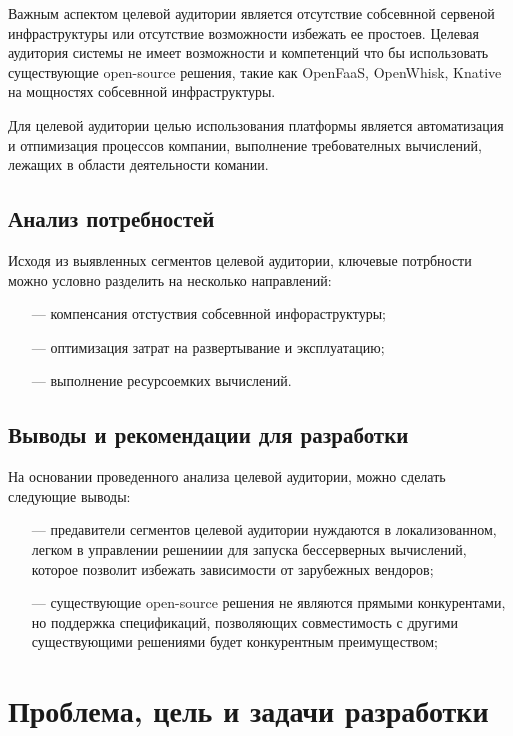 Важным аспектом целевой аудитории является отсутствие собсевнной сервеной инфраструктуры или отсутствие возможности избежать ее простоев. Целевая аудитория системы не имеет возможности и компетенций что бы использовать существующие open-source решения, такие как OpenFaaS, OpenWhisk, Knative на мощностях собсевнной инфраструктуры.

Для целевой аудитории целью использования платформы является автоматизация и отпимизация процессов компании, выполнение требователных вычислений, лежащих в области деятельности комании.

\subsection{Анализ потребностей}

Исходя из выявленных сегментов целевой аудитории, ключевые потрбности можно условно разделить на несколько направлений:
\begin{itemize}
    \item[---]компенсания отстуствия собсевнной инфораструктуры;
    \item[---]оптимизация затрат на развертывание и эксплуатацию;
    \item[---]выполнение ресурсоемких вычислений.
\end{itemize}

\subsection{Выводы и рекомендации для разработки}

На основании проведенного анализа целевой аудитории, можно сделать следующие выводы:

\begin{itemize}
    \item[---]предавители сегментов целевой аудитории нуждаются в локализованном, легком в управлении решениии для запуска бессерверных вычислений, которое позволит избежать зависимости от зарубежных вендоров;
    \item[---]существующие open-source решения не являются прямыми конкурентами, но поддержка спецификаций, позволяющих совместимость с другими существующими решениями будет конкурентным преимуществом;
\end{itemize}

\section{Проблема, цель и задачи разработки}

